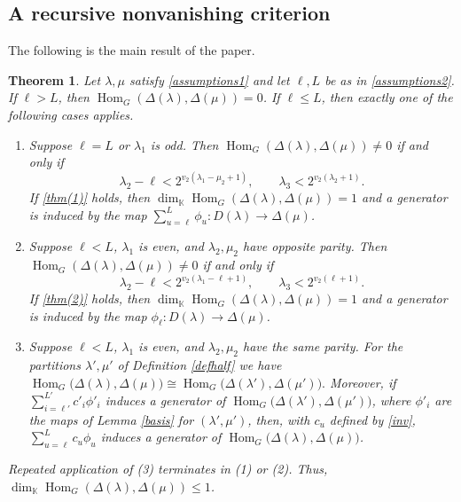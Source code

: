 \documentclass[11pt]{amsart}
\newtheorem{theorem}{Theorem}[section]
\theoremstyle{remark}
\theoremstyle{definition}
\newcommand{\Hom}{\operatorname{Hom}}
\newcommand{\D}{\Delta}
\newcommand{\la}{\lambda}
\newcommand{\K}{\mathbb K}
\numberwithin{equation}{section}
\begin{document}
	\subsection{A recursive nonvanishing criterion}The following is the main result of the paper.
\begin{theorem}\label{thm2}Let $\la, \mu$ satisfy \eqref{assumptions1} and let $\ell, L$ be as in \eqref{assumptions2}.
	If $\ell>L$, then
	$\Hom_G(\Delta(\la),\Delta(\mu))=0$.
	If $\ell\le L$, then exactly one of the following cases applies.
	\begin{enumerate}
		\item\label{case:constant}
		Suppose $\ell=L$ or $\la_1$ is odd.
		Then $\Hom_G(\Delta(\la),\Delta(\mu)) \neq 0$ if and only if
		\begin{equation}\label{thm(1)}
			\la_2-\ell<2^{v_2(\la_1-\mu_2+1)},
			\qquad
			\la_3<2^{v_2(\la_2+1)}.
		\end{equation}
		If \eqref{thm(1)} holds, then $\dim_\K\Hom_G(\Delta(\la),\Delta(\mu))=1$ and a generator is induced by the map $\sum_{u=\ell}^{L}\phi_u : D(\la) \to \D(\mu)$.
		\item\label{case:isolated}
		Suppose $\ell<L$, $\la_1$ is even,
		and $\la_2,\mu_2$ have opposite parity.
		Then $\Hom_G(\Delta(\la),\Delta(\mu)) \neq 0$ if and only if
		\begin{equation}\label{thm(2)}
			\la_2-\ell<2^{v_2(\la_1-\ell+1)},
			\qquad
			\la_3<2^{v_2(\ell+1)}.
		\end{equation}
		If \eqref{thm(2)} holds, then $\dim_\K\Hom_G(\Delta(\la),\Delta(\mu))=1$ and a generator is induced by the map $\phi_\ell : D(\la) \to \D(\mu)$.
		\item\label{case:halving}
		Suppose $\ell<L$, $\la_1$ is even,
		and $\la_2,\mu_2$ have the same parity.
		For the partitions $\la',\mu'$ of
		Definition \ref{defhalf} we have
	$\Hom_G\bigl(\Delta(\la),\Delta(\mu)\bigr) \cong
		\Hom_G\bigl(\Delta(\la'),\Delta(\mu')\bigr).
	$ Moreover, if $\sum_{i=\ell'}^{L'}c'_i\phi'_i$ induces a generator of
	$\Hom_G\bigl(\Delta(\la'),\Delta(\mu')\bigr)$, where $\phi'_i$ are the maps of
	Lemma \ref{basis} for $(\la',\mu')$, then, with $c_u$ defined by \eqref{inv},
	$\sum_{u=\ell}^{L}c_u\phi_u$ induces a generator of
	$\Hom_G\bigl(\Delta(\la),\Delta(\mu)\bigr)$.
	\end{enumerate}
Repeated application of (3) terminates in (1) or (2). Thus, $\dim_\K\Hom_G(\Delta(\la),\Delta(\mu)) \leq 1$.
\end{theorem}
\end{document}
